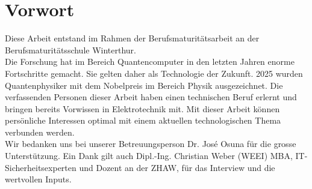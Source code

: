 
\chapter*{Vorwort}
Diese Arbeit entstand im Rahmen der Berufsmaturitätsarbeit an der Berufsmaturitätsschule Winterthur. 
\\
Die Forschung hat im Bereich Quantencomputer in den letzten Jahren enorme Fortschritte gemacht.
Sie gelten daher als Technologie der Zukunft. 
2025 wurden Quantenphysiker mit dem Nobelpreis im Bereich Physik ausgezeichnet.
Die verfassenden Personen dieser Arbeit haben einen technischen Beruf erlernt und bringen bereits Vorwissen in Elektrotechnik mit. 
Mit dieser Arbeit können persönliche Interessen optimal mit einem aktuellen technologischen Thema verbunden werden.
\\
Wir bedanken uns bei unserer Betreuungsperson Dr. José Osuna für die grosse Unterstützung. 
Ein Dank gilt auch Dipl.-Ing. Christian Weber (WEEI) MBA, IT-Sicherheitsexperten und Dozent an der ZHAW, für das Interview und die wertvollen Inputs.
